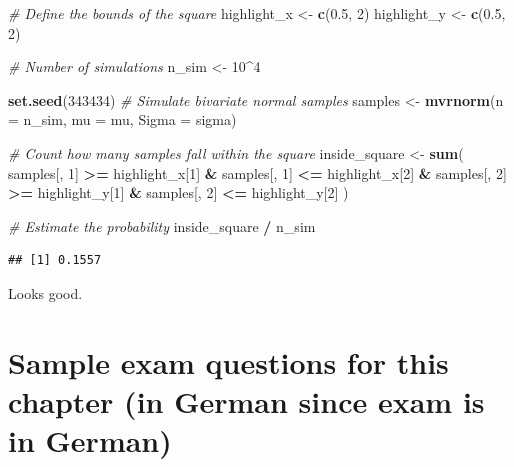 \documentclass[
]{book}
\newenvironment{Shaded}{\begin{snugshade}}{\end{snugshade}}
\newcommand{\AttributeTok}[1]{\textcolor[rgb]{0.13,0.29,0.53}{#1}}
\newcommand{\CommentTok}[1]{\textcolor[rgb]{0.56,0.35,0.01}{\textit{#1}}}
\newcommand{\DecValTok}[1]{\textcolor[rgb]{0.00,0.00,0.81}{#1}}
\newcommand{\FloatTok}[1]{\textcolor[rgb]{0.00,0.00,0.81}{#1}}
\newcommand{\FunctionTok}[1]{\textcolor[rgb]{0.13,0.29,0.53}{\textbf{#1}}}
\newcommand{\NormalTok}[1]{#1}
\newcommand{\OtherTok}[1]{\textcolor[rgb]{0.56,0.35,0.01}{#1}}
\newcommand{\SpecialCharTok}[1]{\textcolor[rgb]{0.81,0.36,0.00}{\textbf{#1}}}
\begin{document}
\begin{Shaded}
\begin{Highlighting}[]
\CommentTok{\# Define the bounds of the square}
\NormalTok{highlight\_x }\OtherTok{\textless{}{-}} \FunctionTok{c}\NormalTok{(}\FloatTok{0.5}\NormalTok{, }\DecValTok{2}\NormalTok{)}
\NormalTok{highlight\_y }\OtherTok{\textless{}{-}} \FunctionTok{c}\NormalTok{(}\FloatTok{0.5}\NormalTok{, }\DecValTok{2}\NormalTok{)}

\CommentTok{\# Number of simulations}
\NormalTok{n\_sim }\OtherTok{\textless{}{-}} \DecValTok{10}\SpecialCharTok{\^{}}\DecValTok{4}

\FunctionTok{set.seed}\NormalTok{(}\DecValTok{343434}\NormalTok{)}
\CommentTok{\# Simulate bivariate normal samples}
\NormalTok{samples }\OtherTok{\textless{}{-}} \FunctionTok{mvrnorm}\NormalTok{(}\AttributeTok{n =}\NormalTok{ n\_sim, }\AttributeTok{mu =}\NormalTok{ mu, }\AttributeTok{Sigma =}\NormalTok{ sigma)}

\CommentTok{\# Count how many samples fall within the square}
\NormalTok{inside\_square }\OtherTok{\textless{}{-}} \FunctionTok{sum}\NormalTok{(}
\NormalTok{  samples[, }\DecValTok{1}\NormalTok{] }\SpecialCharTok{\textgreater{}=}\NormalTok{ highlight\_x[}\DecValTok{1}\NormalTok{] }\SpecialCharTok{\&}\NormalTok{ samples[, }\DecValTok{1}\NormalTok{] }\SpecialCharTok{\textless{}=}\NormalTok{ highlight\_x[}\DecValTok{2}\NormalTok{] }\SpecialCharTok{\&}
\NormalTok{  samples[, }\DecValTok{2}\NormalTok{] }\SpecialCharTok{\textgreater{}=}\NormalTok{ highlight\_y[}\DecValTok{1}\NormalTok{] }\SpecialCharTok{\&}\NormalTok{ samples[, }\DecValTok{2}\NormalTok{] }\SpecialCharTok{\textless{}=}\NormalTok{ highlight\_y[}\DecValTok{2}\NormalTok{]}
\NormalTok{)}

\CommentTok{\# Estimate the probability}
\NormalTok{inside\_square }\SpecialCharTok{/}\NormalTok{ n\_sim}
\end{Highlighting}
\end{Shaded}

\begin{verbatim}
## [1] 0.1557
\end{verbatim}

Looks good.

\section{Sample exam questions for this chapter (in German since exam is in German)}\label{sample-exam-questions-for-this-chapter-in-german-since-exam-is-in-german}
\end{document}
